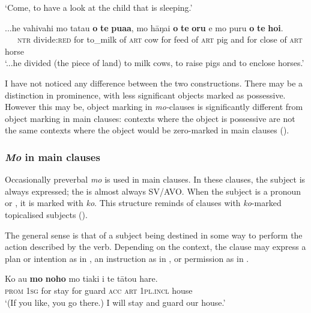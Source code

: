 \glt 
‘Come, to have a look at the child that is sleeping.’ \textstyleExampleref{[R235.047]} 
\z

\ea\label{ex:11.157}
\gll ...he vahivahi mo tatau \textbf{o} \textbf{te} \textbf{pua{\ꞌ}a}, mo hāŋai \textbf{o} \textbf{te} \textbf{oru} {\ꞌ}e mo puru \textbf{o} \textbf{te} \textbf{hoi}.\\
~~~\textsc{ntr} divide:\textsc{red} for to\_milk of \textsc{art} cow for feed of \textsc{art} pig and for close of \textsc{art} horse\\

\glt
‘...he divided (the piece of land) to milk cows, to raise pigs and to enclose horses.’ \textstyleExampleref{[R250.047]} 
\z

I have not noticed any difference between the two constructions. There may be a distinction in prominence, with less significant objects marked as possessive. However this may be, object marking in \textit{mo-}clauses is significantly different from object marking in main clauses: contexts where the object is possessive are not the same contexts where the object would be zero-marked in main clauses ().

\subsubsection{\textit{Mo} in main clauses}\label{sec:11.5.1.3}

Occasionally preverbal \textit{mo} is used in main clauses. In these clauses, the subject is always expressed; the  is almost always SV/AVO. When the subject is a pronoun or , it is marked with \textit{ko}. This structure reminds of clauses with \textit{ko}{}-marked topicalised subjects ().

The general sense is that of a subject being destined in some way to perform the action described by the verb. Depending on the context, the clause may express a plan or intention as in , an instruction as in , or permission as in .

\ea\label{ex:11.158}
\gll Ko au \textbf{mo} \textbf{noho} mo tiaki i te tātou hare. \\
\textsc{prom} \textsc{1sg} for stay for guard \textsc{acc} \textsc{art} \textsc{1pl.incl} house \\

\glt 
‘(If you like, you go there.) I will stay and guard our house.’ \textstyleExampleref{[R399.130]} 
\z

